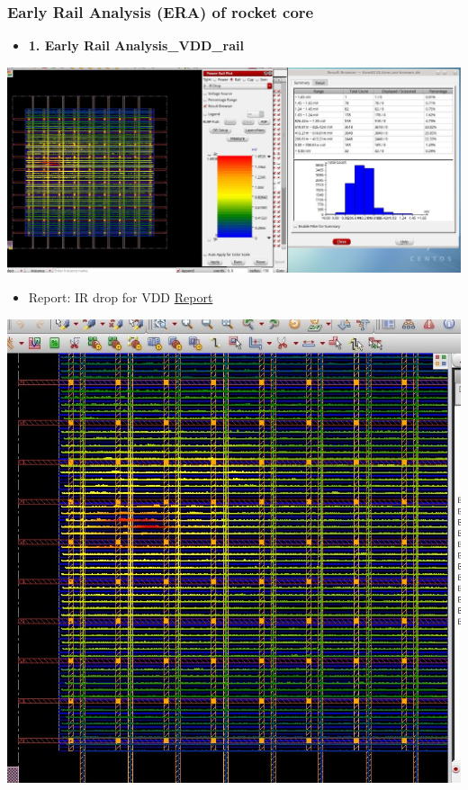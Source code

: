 \documentclass[a4paper]{article}
\begin{document}
\subsubsection{Early Rail Analysis (ERA) of rocket core}
\label{sec:org55d519f}
\begin{itemize}
\item \textbf{\textbf{1. Early Rail Analysis\_VDD\_rail}}
\end{itemize}
\begin{center}
\includegraphics[width=.9\linewidth]{./img/rocket_era1_vdd.jpg}
\end{center}
\begin{itemize}
\item Report: IR drop for VDD \href{./rep/rocket\_VDD.main.html}{Report}
\end{itemize}
\begin{center}
\includegraphics[width=.9\linewidth]{./img/rocket_era1_vddd.jpg}
\end{center}
\end{document}

